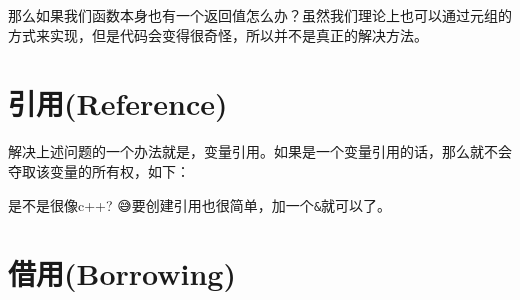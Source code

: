 \documentclass[12pt]{article}
\begin{document}
那么如果我们函数本身也有一个返回值怎么办？虽然我们理论上也可以通过元组的方式来实现，但是代码会变得很奇怪，所以并不是真正的解决方法。

\section{引用(Reference)}\label{ux5f15ux7528reference}

解决上述问题的一个办法就是，变量引用。如果是一个变量引用的话，那么就不会夺取该变量的所有权，如下：

\begin{Shaded}
\begin{Highlighting}[]
\OperatorTok{:} \OperatorTok{\&}\NormalTok{) }\OperatorTok{\{}
    \NormalTok{(}\OperatorTok{,} \NormalTok{)}\OperatorTok{;}
\OperatorTok{\}}

\OperatorTok{\{}
    \OperatorTok{=}\OperatorTok{;}
\OperatorTok{\&}\OperatorTok{;}                
    \NormalTok{(}\OperatorTok{,}\OperatorTok{;}       
\OperatorTok{\}}
\end{Highlighting}
\end{Shaded}

是不是很像c++? 😅要创建引用也很简单，加一个\texttt{\&}就可以了。

\begin{Shaded}
\begin{Highlighting}[]
\OperatorTok{=} \PreprocessorTok{::}\NormalTok{)}\OperatorTok{;}
\OperatorTok{:} \OperatorTok{\&} \OperatorTok{=} \OperatorTok{\&}\OperatorTok{;}
\NormalTok{(}\OperatorTok{,}\OperatorTok{,}\OperatorTok{;}   
\end{Highlighting}
\end{Shaded}

\section{借用(Borrowing)}\label{ux501fux7528borrowing}
\end{document}
